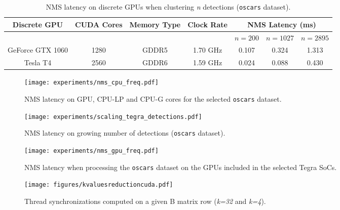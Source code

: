 \begin{table*}
\renewcommand{\arraystretch}{1.3}
\scriptsize
\centering
\begin{tabular}{|c|c|c|c|c|c|c|}
\hline
\textbf{Discrete GPU} & \textbf{CUDA Cores} & \textbf{Memory Type} & \textbf{Clock Rate} & \multicolumn{3}{c|}{\textbf{NMS Latency (ms)}} \\
\hline
 & & & & $n = 200$ & $n = 1027$ & $n = 2895$ \\ \cline{5-7}
GeForce GTX 1060 & 1280 & GDDR5 & 1.70 GHz & 0.107 & 0.324 & 1.313 \\
Tesla T4 & 2560 & GDDR6 & 1.59 GHz & 0.024 & 0.088 & 0.430 \\
\hline
\end{tabular}
\caption{NMS latency on discrete GPUs when clustering \emph{n} detections (\texttt{oscars} dataset).}
\label{tab:nmsdiscretegpu}
\end{table*}

\begin{figure}[!t]
  \centering
  \texttt{[image: experiments/nms\_cpu\_freq.pdf]}
  \caption{\label{fig:nmscpugpufreq} NMS latency on GPU, CPU-LP and CPU-G cores for the selected \texttt{oscars} dataset.}
\end{figure} 

\begin{figure}[t]
  \centering
  \texttt{[image: experiments/scaling\_tegra\_detections.pdf]}
  \caption{\label{fig:nmsdetectionsscaling} NMS latency on growing number of detections (\texttt{oscars} dataset).}
\end{figure}

\begin{figure}
  \centering
  \texttt{[image: experiments/nms\_gpu\_freq.pdf]}
  \caption{\label{fig:nmsgpufreq} NMS latency when processing the \texttt{oscars} dataset on the GPUs included in the selected Tegra SoCs.}
\end{figure}

\begin{figure*}[!t]
  \centering
  \texttt{[image: figures/kvaluesreductioncuda.pdf]}
  \caption{\label{fig:kparametercomp} Thread synchronizations computed on a given B matrix row (\emph{k=32} and \emph{k=4}).}
\end{figure*}


